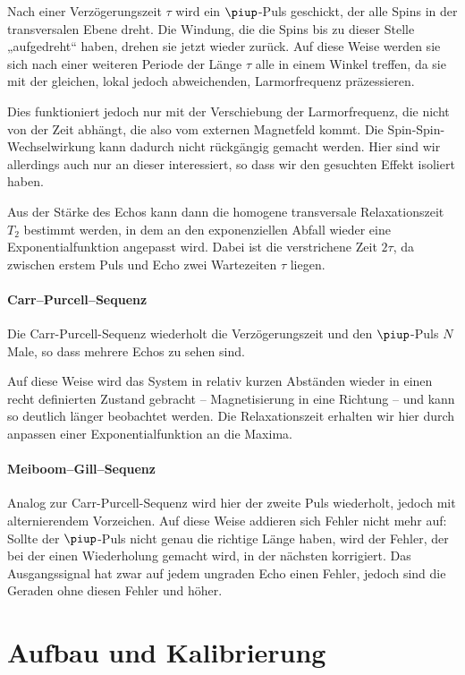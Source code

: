 Nach einer Verzögerungszeit $\tau$ wird ein $\piup$-Puls geschickt, der alle
Spins in der transversalen Ebene dreht. Die Windung, die die Spins bis zu
dieser Stelle „aufgedreht“ haben, drehen sie jetzt wieder zurück. Auf diese
Weise werden sie sich nach einer weiteren Periode der Länge $\tau$ alle in
einem Winkel treffen, da sie mit der gleichen, lokal jedoch abweichenden,
Larmorfrequenz präzessieren.

Dies funktioniert jedoch nur mit der Verschiebung der Larmorfrequenz, die nicht
von der Zeit abhängt, die also vom externen Magnetfeld kommt. Die
Spin-Spin-Wechselwirkung kann dadurch nicht rückgängig gemacht werden. Hier
sind wir allerdings auch nur an dieser interessiert, so dass wir den gesuchten
Effekt isoliert haben.

Aus der Stärke des Echos kann dann die homogene transversale Relaxationszeit
$T_2$ bestimmt werden, in dem an den exponenziellen Abfall wieder eine
Exponentialfunktion angepasst wird. Dabei ist die verstrichene Zeit $2 \tau$,
da zwischen erstem Puls und Echo zwei Wartezeiten $\tau$ liegen.

\subsubsection{Carr–Purcell–Sequenz}

Die Carr-Purcell-Sequenz wiederholt die Verzögerungszeit und den $\piup$-Puls
$N$ Male, so dass mehrere Echos zu sehen sind.

Auf diese Weise wird das System in relativ kurzen Abständen wieder in einen
recht definierten Zustand gebracht – Magnetisierung in eine Richtung – und kann
so deutlich länger beobachtet werden. Die Relaxationszeit erhalten wir hier
durch anpassen einer Exponentialfunktion an die Maxima.

\subsubsection{Meiboom–Gill–Sequenz}

Analog zur Carr-Purcell-Sequenz wird hier der zweite Puls wiederholt, jedoch
mit alternierendem Vorzeichen. Auf diese Weise addieren sich Fehler nicht mehr
auf: Sollte der $\piup$-Puls nicht genau die richtige Länge haben, wird der
Fehler, der bei der einen Wiederholung gemacht wird, in der nächsten
korrigiert. Das Ausgangssignal hat zwar auf jedem ungraden Echo einen Fehler,
jedoch sind die Geraden ohne diesen Fehler und höher.

\chapter{Aufbau und Kalibrierung}
